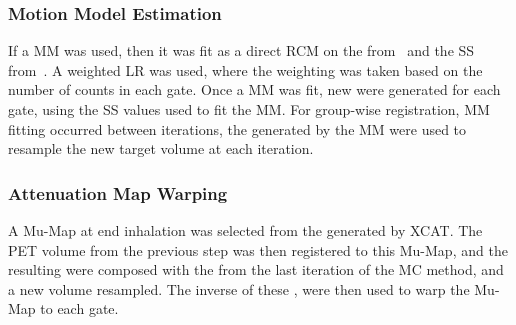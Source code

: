             \subsubsection{Motion Model Estimation} \label{sec:comparison_of_motion_correction_methods_incorporating_motion_modelling_for_pet/ct_using_a_single_breath_hold_attenuation_map_motion_model_estimation}
                If a \gls{MM} was used, then it was fit as a direct \gls{RCM} on the  from~ and the \gls{SS} from~. A weighted \gls{LR} was used, where the weighting was taken based on the number of counts in each gate. Once a \gls{MM} was fit, new  were generated for each gate, using the \gls{SS} values used to fit the \gls{MM}. For group-wise registration, \gls{MM} fitting occurred between iterations, the  generated by the \gls{MM} were used to resample the new target volume at each iteration.
            
            \subsubsection{Attenuation Map Warping} \label{sec:comparison_of_motion_correction_methods_incorporating_motion_modelling_for_pet/ct_using_a_single_breath_hold_attenuation_map_attenuation_map_warping}
                A \gls{Mu-Map} at end inhalation was selected from the  generated by \gls{XCAT}. The \gls{PET} volume from the previous step was then registered to this \gls{Mu-Map}, and the resulting  were composed with the  from the last iteration of the \gls{MC} method, and a new volume resampled. The inverse of these , were then used to warp the \gls{Mu-Map} to each gate.
            
